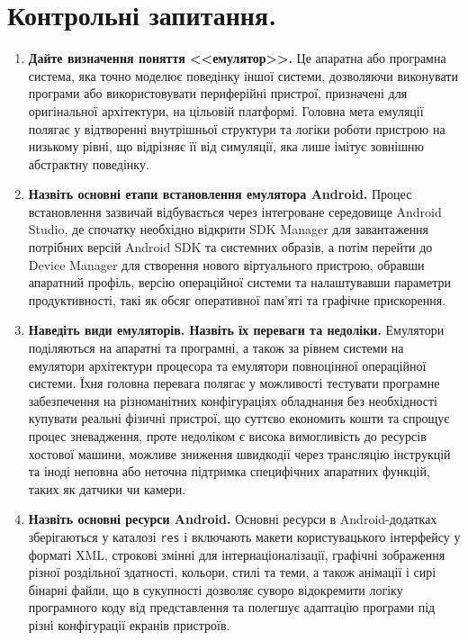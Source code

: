 \documentclass[14pt, a4paper]{extreport}
\begin{document}
	\section*{Контрольні запитання.}

	\begin{enumerate}
		\item \textbf{Дайте визначення поняття <<емулятор>>.} Це апаратна або програмна система, яка точно моделює поведінку іншої системи, дозволяючи виконувати програми або використовувати периферійні пристрої, призначені для оригінальної архітектури, на цільовій платформі. Головна мета емуляції полягає у відтворенні внутрішньої структури та логіки роботи пристрою на низькому рівні, що відрізняє її від симуляції, яка лише імітує зовнішню абстрактну поведінку.
		
		\item \textbf{Назвіть основні етапи встановлення емулятора Android.} Процес встановлення зазвичай відбувається через інтегроване середовище Android Studio, де спочатку необхідно відкрити SDK Manager для завантаження потрібних версій Android SDK та системних образів, а потім перейти до Device Manager для створення нового віртуального пристрою, обравши апаратний профіль, версію операційної системи та налаштувавши параметри продуктивності, такі як обсяг оперативної пам'яті та графічне прискорення.
		
		\item \textbf{Наведіть види емуляторів. Назвіть їх переваги та недоліки.} Емулятори поділяються на апаратні та програмні, а також за рівнем системи на емулятори архітектури процесора та емулятори повноцінної операційної системи. Їхня головна перевага полягає у можливості тестувати програмне забезпечення на різноманітних конфігураціях обладнання без необхідності купувати реальні фізичні пристрої, що суттєво економить кошти та спрощує процес зневадження, проте недоліком є висока вимогливість до ресурсів хостової машини, можливе зниження швидкодії через трансляцію інструкцій та іноді неповна або неточна підтримка специфічних апаратних функцій, таких як датчики чи камери.
		
		\item \textbf{Назвіть основні ресурси Android.} Основні ресурси в Android-додатках зберігаються у каталозі \texttt{res} і включають макети користувацького інтерфейсу у форматі XML, строкові змінні для інтернаціоналізації, графічні зображення різної роздільної здатності, кольори, стилі та теми, а також анімації і сирі бінарні файли, що в сукупності дозволяє суворо відокремити логіку програмного коду від представлення та полегшує адаптацію програми під різні конфігурації екранів пристроїв.
		

\end{enumerate}
\end{document}
